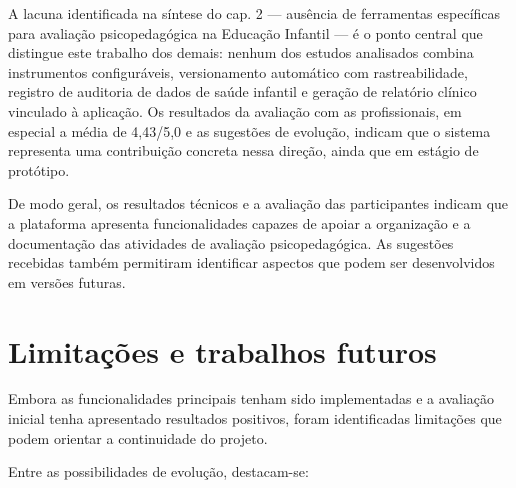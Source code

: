 A lacuna identificada na síntese do cap. 2 — ausência de ferramentas específicas para avaliação psicopedagógica na Educação Infantil — é o ponto central que distingue este trabalho dos demais: nenhum dos estudos analisados combina instrumentos configuráveis, versionamento automático com rastreabilidade, registro de auditoria de dados de saúde infantil e geração de relatório clínico vinculado à aplicação. Os resultados da avaliação com as profissionais, em especial a média de 4,43/5,0 e as sugestões de evolução, indicam que o sistema representa uma contribuição concreta nessa direção, ainda que em estágio de protótipo.

De modo geral, os resultados técnicos e a avaliação das participantes indicam que a plataforma apresenta funcionalidades capazes de apoiar a organização e a documentação das atividades de avaliação psicopedagógica. As sugestões recebidas também permitiram identificar aspectos que podem ser desenvolvidos em versões futuras.

\section{Limitações e trabalhos futuros}\label{sec:limitacoes}

Embora as funcionalidades principais tenham sido implementadas e a avaliação inicial tenha apresentado resultados positivos, foram identificadas limitações que podem orientar a continuidade do projeto.

Entre as possibilidades de evolução, destacam-se:

